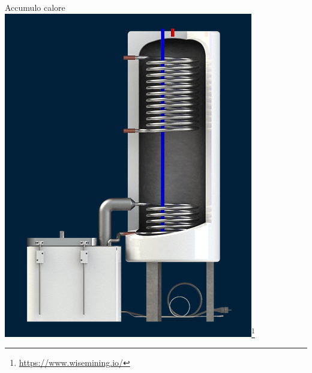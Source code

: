 \documentclass{beamer}
\begin{document}
\begin{frame}{Accumulo calore \Bitcoin}
    \centering
    \includegraphics[height=.8\textheight]{images/sato.png}\footnote{\url{https://www.wisemining.io/}}\quad
\end{frame}
\end{document}

